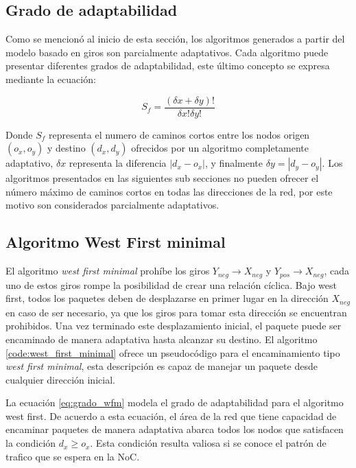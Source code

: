 \subsection{Grado de adaptabilidad}

Como se mencionó al inicio de esta sección, los algoritmos generados a partir del modelo basado en giros son parcialmente adaptativos. Cada algoritmo puede presentar diferentes grados de adaptabilidad, este último concepto se expresa mediante la ecuación:

\begin{equation}
	S_f = \frac{(\delta x + \delta y)!}{\delta x ! \delta y!}
	\label{eq:grado_adaptabilidad}
\end{equation}

Donde $S_{f}$ representa el numero de caminos cortos entre los nodos origen $(o_x, o_y)$ y destino $(d_x, d_y)$ ofrecidos por un algoritmo completamente adaptativo, $\delta x$ representa la diferencia $| d_x - o_x |$, y finalmente $\delta y = | d_y - o_y |$. Los algoritmos presentados en las siguientes sub secciones no pueden ofrecer el número máximo de caminos cortos en todas las direcciones de la red, por este motivo son considerados parcialmente adaptativos.


\subsection{Algoritmo West First minimal}
	\label{subsec:algoritmo_west_first_minimal}

El algoritmo \textit{west first minimal} prohíbe los giros $Y_{neg} \rightarrow X_{neg}$ y $Y_{pos} \rightarrow X_{neg}$, cada uno de estos giros rompe la posibilidad de crear una relación cíclica. Bajo west first, todos los paquetes deben de desplazarse en primer lugar en la dirección $X_{neg}$ en caso de ser necesario, ya que los giros para tomar esta dirección se encuentran prohibidos. Una vez terminado este desplazamiento inicial, el paquete puede ser encaminado de manera adaptativa hasta alcanzar su destino. El algoritmo \ref{code:west_first_minimal} ofrece un pseudocódigo para el encaminamiento tipo \textit{west first minimal}, esta descripción es capaz de manejar un paquete desde cualquier dirección inicial.

La ecuación \ref{eq:grado_wfm} modela el grado de adaptabilidad para el algoritmo west first. De acuerdo a esta ecuación, el área de la red que tiene capacidad de encaminar paquetes de manera adaptativa abarca todos los nodos que satisfacen la condición $d_x \ge o_x$. Esta condición resulta valiosa si se conoce el patrón de trafico que se espera en la NoC.

